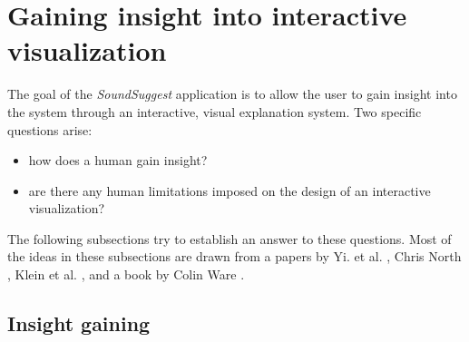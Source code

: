 
% 
\section{Gaining insight into interactive visualization}\label{chapter:literature_study:section:user}

The goal of the \emph{SoundSuggest} application is to allow the user to gain insight into the system through an interactive, visual explanation system. Two specific questions arise:

\begin{itemize}
	\item how does a human gain insight?
	\item are there any human limitations imposed on the design of an interactive visualization?
\end{itemize}

The following subsections try to establish an answer to these questions. Most of the ideas in these subsections are drawn from a papers by Yi. et al. \cite{yi:2008}, Chris North \cite{north:2006}, Klein et al. \cite{Klein:2006:MSS:1158821.1159015, klein:2006:MSS:1175882.1176017}, and a book by Colin Ware \cite{ware:2004}.










\subsection{Insight gaining}\label{chapter:literature_study:section:user:subsection:insight}

